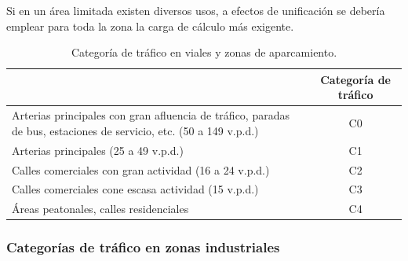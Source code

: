 Si en un área limitada existen diversos usos, a efectos de unificación se debería emplear para toda la zona la carga de cálculo más exigente.

\begin{table}[!htb]
\centering
\begin{tabular}{|p{7cm}|c|}
\hline
\centering{Uso previsto} & Categoría de tráfico\\ \hline
Arterias principales con gran afluencia de tráfico, paradas de bus, estaciones de servicio, etc. (50 a 149 v.p.d.) & C0\\ \hline
Arterias principales (25 a 49 v.p.d.) & C1\\ \hline
Calles comerciales con gran actividad (16 a 24 v.p.d.) & C2\\ \hline
Calles comerciales cone escasa actividad (15 v.p.d.) & C3\\ \hline
Áreas peatonales, calles residenciales & C4\\ \hline
\end{tabular}
\caption{Categoría de tráfico en viales y zonas de aparcamiento.}
\label{categoriadetraficoenviales}
\end{table}


\subsubsection{Categorías de tráfico en zonas industriales}

